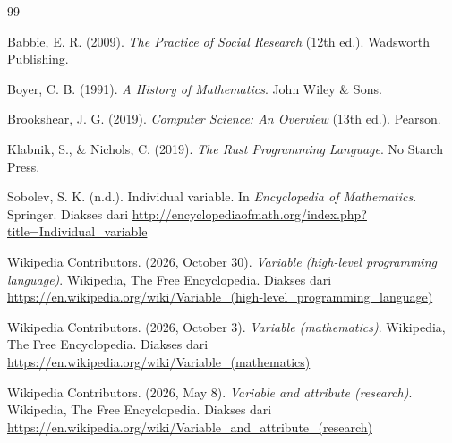 \documentclass[11pt,a4paper]{article}
\begin{document}
\begin{thebibliography}{99}

	Babbie, E. R. (2009). \textit{The Practice of Social Research} (12th ed.). Wadsworth Publishing.

	Boyer, C. B. (1991). \textit{A History of Mathematics}. John Wiley \& Sons.

	Brookshear, J. G. (2019). \textit{Computer Science: An Overview} (13th ed.). Pearson.

	Klabnik, S., \& Nichols, C. (2019). \textit{The Rust Programming Language}. No Starch Press.

	Sobolev, S. K. (n.d.). Individual variable. In \textit{Encyclopedia of Mathematics}. Springer. Diakses dari \url{http://encyclopediaofmath.org/index.php?title=Individual_variable}

	Wikipedia Contributors. (2026, October 30). \textit{Variable (high-level programming language)}. Wikipedia, The Free Encyclopedia. Diakses dari \url{https://en.wikipedia.org/wiki/Variable_(high-level_programming_language)}

	Wikipedia Contributors. (2026, October 3). \textit{Variable (mathematics)}. Wikipedia, The Free Encyclopedia. Diakses dari \url{https://en.wikipedia.org/wiki/Variable_(mathematics)}

	Wikipedia Contributors. (2026, May 8). \textit{Variable and attribute (research)}. Wikipedia, The Free Encyclopedia. Diakses dari \url{https://en.wikipedia.org/wiki/Variable_and_attribute_(research)}

\end{thebibliography}
\end{document}
